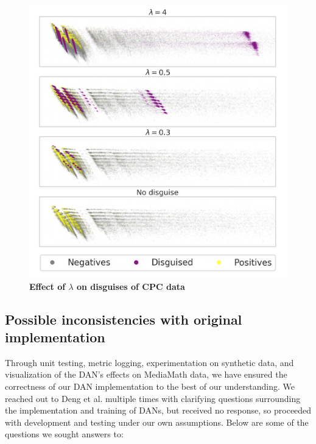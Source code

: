 \documentclass{proc}
\begin{document}
\begin{figure}[h!]
		\includegraphics*[scale=0.35]{../figures/2d-pca.png}
		\caption{\textbf{Effect of $\lambda$ on disguises of CPC data}}
		\label{fig:2d-pca}
\end{figure}

\subsection{Possible inconsistencies with original implementation}

Through unit testing, metric logging, experimentation on synthetic data, and visualization of the DAN's effects on MediaMath data, we have ensured the correctness of our DAN implementation to the best of our understanding. We reached out to Deng et al. multiple times with clarifying questions surrounding the implementation and training of DANs, but received no response, so proceeded with development and testing under our own assumptions. Below are some of the questions we sought answers to:
\end{document}
